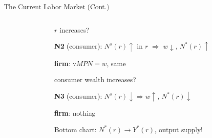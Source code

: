 \documentclass[11pt,aspectratio=169,usenames,dvipsnames]{beamer}
\let\tempone\itemize
\let\temptwo\enditemize
\renewenvironment{itemize}{\tempone\addtolength{\itemsep}{\fill}}{\temptwo}
\begin{document}
\begin{frame}{The Current Labor Market (Cont.)}
\begin{columns}
\begin{column}{0.5\textwidth}
        \end{column}
        \begin{column}{0.5\textwidth}
            \begin{itemize}
                \item $ r $ increases?
                \begin{itemize}
                    \item \textbf{N2} (consumer): $ N^{s}( r ) \uparrow  $ in $ r $ $ \Rightarrow  $ $ w \downarrow  $, $ N^{*}( r ) \uparrow  $
                    \item \textbf{firm}: $ \because MPN = w $, same
                \end{itemize}
                \item consumer wealth increases?
                \begin{itemize}
                    \item \textbf{N3} (consumer): $ N^{s}( r ) \downarrow \Rightarrow w \uparrow  $, $ N^{*}( r ) \downarrow  $
                    \item \textbf{firm}: nothing
                \end{itemize}
                \item Bottom chart: $ N^{*}( r ) \rightarrow Y^{*}( r ) $, \alert{output supply}!
            \end{itemize}
        \end{column}
    \end{columns}


\end{frame}
\end{document}
